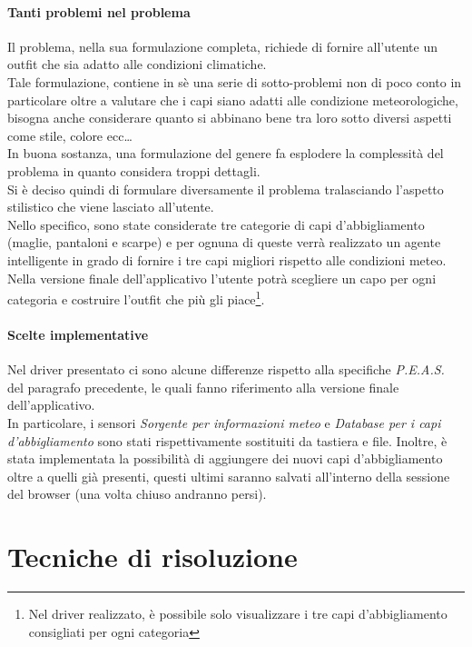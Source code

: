 \documentclass[a4paper, 11pt, oneside]{report}
\begin{document}
    \subsection{Tanti problemi nel problema}
    Il problema, nella sua formulazione completa, richiede di fornire all'utente un outfit che sia adatto
    alle condizioni climatiche.\\
    Tale formulazione, contiene in sè una serie di sotto-problemi non di poco conto in particolare oltre
    a valutare che i capi siano adatti alle condizione meteorologiche, bisogna anche considerare quanto si abbinano bene
    tra loro sotto diversi aspetti come stile, colore ecc\ldots\\
    In buona sostanza, una formulazione del genere fa esplodere la complessità del problema in quanto considera troppi dettagli.\\
    Si è deciso quindi di formulare diversamente il problema tralasciando l'aspetto stilistico che viene lasciato all'utente.\\
    Nello specifico, sono state considerate tre categorie di capi d'abbigliamento (maglie, pantaloni e scarpe) e per ognuna di queste verrà realizzato
    un agente intelligente in grado di fornire i tre capi migliori rispetto alle condizioni meteo.
    Nella versione finale dell'applicativo l'utente potrà scegliere un capo per ogni categoria e costruire l'outfit che più gli piace\footnote{Nel driver realizzato, è possibile solo visualizzare i tre capi d'abbigliamento consigliati per ogni categoria}.
    \subsection{Scelte implementative}
    Nel driver presentato ci sono alcune differenze rispetto alla specifiche \emph{P.E.A.S.} del paragrafo precedente, le quali fanno
    riferimento alla versione finale dell'applicativo.\\
    In particolare, i sensori \emph{Sorgente per informazioni meteo} e \emph{Database per i capi d'abbigliamento} sono stati rispettivamente sostituiti
    da tastiera e file.
    Inoltre, è stata implementata la possibilità di aggiungere dei nuovi capi d'abbigliamento oltre a quelli già presenti, questi ultimi
    saranno salvati all'interno della sessione del browser (una volta chiuso andranno persi).
    \part{Tecniche di risoluzione}
\end{document}
